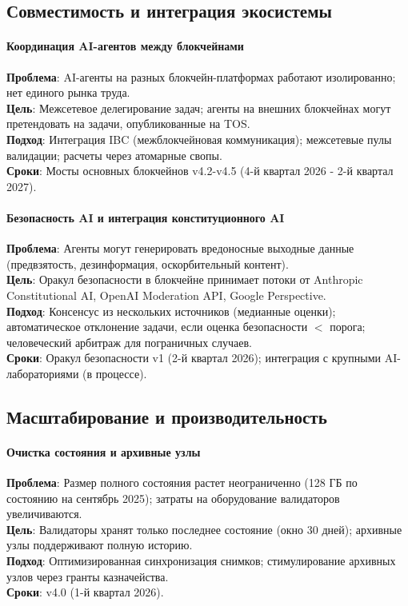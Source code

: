\documentclass[11pt]{article}
\begin{document}
\subsection{Совместимость и интеграция экосистемы}

\paragraph{Координация AI-агентов между блокчейнами}
\textbf{Проблема}: AI-агенты на разных блокчейн-платформах работают изолированно; нет единого рынка труда.\\
\textbf{Цель}: Межсетевое делегирование задач; агенты на внешних блокчейнах могут претендовать на задачи, опубликованные на TOS.\\
\textbf{Подход}: Интеграция IBC (межблокчейновая коммуникация); межсетевые пулы валидации; расчеты через атомарные свопы.\\
\textbf{Сроки}: Мосты основных блокчейнов v4.2-v4.5 (4-й квартал 2026 - 2-й квартал 2027).

\paragraph{Безопасность AI и интеграция конституционного AI}
\textbf{Проблема}: Агенты могут генерировать вредоносные выходные данные (предвзятость, дезинформация, оскорбительный контент).\\
\textbf{Цель}: Оракул безопасности в блокчейне принимает потоки от Anthropic Constitutional AI, OpenAI Moderation API, Google Perspective.\\
\textbf{Подход}: Консенсус из нескольких источников (медианные оценки); автоматическое отклонение задачи, если оценка безопасности $<$ порога; человеческий арбитраж для пограничных случаев.\\
\textbf{Сроки}: Оракул безопасности v1 (2-й квартал 2026); интеграция с крупными AI-лабораториями (в процессе).

\subsection{Масштабирование и производительность}

\paragraph{Очистка состояния и архивные узлы}
\textbf{Проблема}: Размер полного состояния растет неограниченно (128 ГБ по состоянию на сентябрь 2025); затраты на оборудование валидаторов увеличиваются.\\
\textbf{Цель}: Валидаторы хранят только последнее состояние (окно 30 дней); архивные узлы поддерживают полную историю.\\
\textbf{Подход}: Оптимизированная синхронизация снимков; стимулирование архивных узлов через гранты казначейства.\\
\textbf{Сроки}: v4.0 (1-й квартал 2026).
\end{document}
